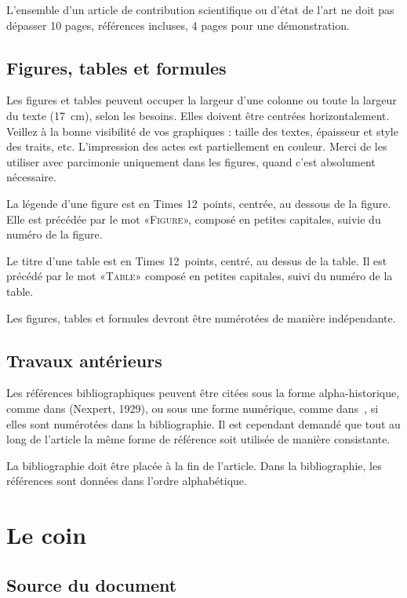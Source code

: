 \documentclass[demonstration]{jfsma}
\begin{document}
L'ensemble d'un article de contribution scientifique ou d'état de l'art ne doit
pas dépasser 10 pages, références incluses, 4 pages pour une démonstration.


\subsection{Figures, tables et formules}

Les figures et tables peuvent occuper la largeur d'une colonne ou toute la
largeur du texte (17~cm), selon les besoins. Elles doivent être centrées
horizontalement. Veillez à la bonne visibilité de vos graphiques : taille des
textes, épaisseur et style des traits, etc. L'impression des actes est
partiellement en couleur. Merci de les utiliser avec parcimonie uniquement
dans les figures, quand c'est absolument nécessaire.

La légende d'une figure est en Times 12~points, centrée, au dessous de la
figure. Elle est précédée par le mot «\textsc{Figure}», composé en petites
capitales, suivie du numéro de la figure.

Le titre d'une table est en Times 12~points, centré, au dessus de la table. Il
est précédé par le mot «\textsc{Table}» composé en petites capitales, suivi du
numéro de la table.

Les figures, tables et formules devront être numérotées de manière
indépendante.

\subsection{Travaux antérieurs}

Les références bibliographiques peuvent être citées sous la forme
alpha-historique, comme dans (Nexpert, 1929), ou sous une forme numérique, comme
dans~\cite{foo}, si elles sont numérotées dans la bibliographie. Il est
cependant demandé que tout au long de l'article la même forme de référence soit
utilisée de manière consistante.

La bibliographie doit être placée à la fin de l'article. Dans la
bibliographie, les références sont données dans l'ordre alphabétique.

\section{Le coin \LaTeXe}

\subsection{Source du document}
\end{document}
